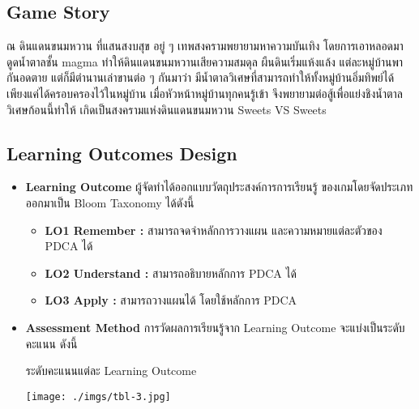 \documentclass[12pt,oneside,openright,a4paper]{cpe-thai-project}
\begin{document}
\subsection{Game Story}
ณ ดินแดนขนมหวาน ที่แสนสงบสุข อยู่ ๆ เทพสงครามพยายามหาความบันเทิง
โดยการเอาหลอดมาดูดน้ำตาลชั้น magma ทำให้ดินแดนขนมหวานเสียความสมดุล 
ผืนดินเริ่มแห้งแล้ง แต่ละหมู่บ้านพากันอดตาย แต่ก็มีตำนานเล่าขานต่อ ๆ กันมาว่า 
มีน้ำตาลวิเศษที่สามารถทำให้ทั้งหมู่บ้านอิ่มทิพย์ได้ เพียงแค่ได้ครอบครองไว้ในหมู่บ้าน 
เมื่อหัวหน้าหมู่บ้านทุกคนรู้เข้า จึงพยายามต่อสู้เพื่อแย่งชิงน้ำตาลวิเศษก้อนนี้ทำให้
เกิดเป็นสงครามแห่งดินแดนขนมหวาน Sweets VS Sweets


\subsection{Learning Outcomes Design}
\begin{itemize}
  \item \textbf{Learning Outcome} ผู้จัดทำได้ออกแบบวัตถุประสงค์การการเรียนรู้
  ของเกมโดยจัดประเภทออกมาเป็น Bloom Taxonomy ได้ดังนี้

  \begin{itemize}
    \item \textbf{LO1 Remember :} สามารถจดจำหลักการวางแผน
    และความหมายแต่ละตัวของ PDCA ได้
    \item \textbf{LO2 Understand :} สามารถอธิบายหลักการ PDCA ได้
    \item \textbf{LO3 Apply :} สามารถวางแผนได้ โดยใช้หลักการ PDCA
  \end{itemize}

  \item \textbf{Assessment Method} การวัดผลการเรียนรู้จาก 
  Learning Outcome จะแบ่งเป็นระดับคะแนน ดังนี้

  \begin{table}[H]
    \caption{ระดับคะแนนแต่ละ Learning Outcome}\label{tbl:tab-3}
    \centering
    \texttt{[image: ./imgs/tbl-3.jpg]}
  \end{table}
\end{itemize}
\end{document}
